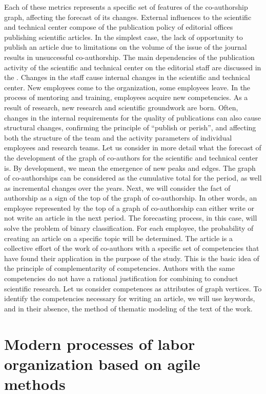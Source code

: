 \documentclass[12pt]{report}
\theoremstyle{definition}
\begin{document}
Each of these metrics represents a specific set of features of the co-authorship graph, affecting the forecast of its changes.
External influences to the scientific and technical center compose of the publication policy of editorial offices publishing scientific articles.
In the simplest case, the lack of opportunity to publish an article due to limitations on the volume of the issue of the journal results in unsuccessful co-authorship.
The main dependencies of the publication activity of the scientific and technical center on the editorial staff are discussed in the \cite{krasnov2017model}.
Changes in the staff cause internal changes in the scientific and technical center.
New employees come to the organization, some employees leave.
In the process of mentoring and training, employees acquire new competencies.
As a result of research, new research and scientific groundwork are born.
Often, changes in the internal requirements for the quality of publications can also cause structural changes, confirming the principle of  ``publish or perish'', and affecting both the structure of the team and the activity parameters of individual employees and research teams.
Let us consider in more detail what the forecast of the development of the graph of co-authors for the scientific and technical center is.
By development, we mean the emergence of new peaks and edges.
The graph of co-authorships can be considered as the cumulative total for the period, as well as incremental changes over the years.
Next, we will consider the fact of authorship as a sign of the top of the graph of co-authorship.
In other words, an employee represented by the top of a graph of co-authorship can either write or not write an article in the next period.
The forecasting process, in this case, will solve the problem of binary classification.
For each employee, the probability of creating an article on a specific topic will be determined.
The article is a collective effort of the work of co-authors with a specific set of competencies that have found their application in the purpose of the study.
This is the basic idea of the principle of complementarity of competencies.
Authors with the same competencies do not have a rational justification for combining to conduct scientific research.
Let us consider competences as attributes of graph vertices.
To identify the competencies necessary for writing an article, we will use keywords, and in their absence, the method of thematic modeling of the text of the work.

\section{Modern processes of labor organization based on agile methods}
\end{document}
